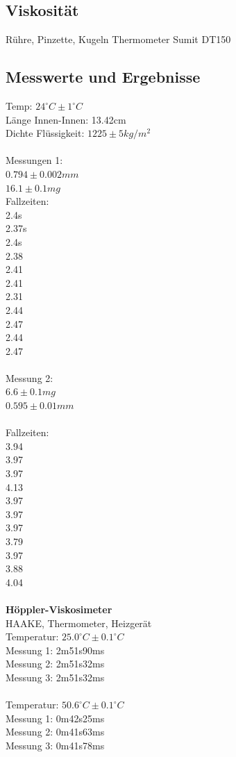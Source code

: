 \documentclass[12pt,a4paper]{article}
\begin{document}
\begin{multicols}{2}
\section{Viskosität}
Rühre, Pinzette, Kugeln
Thermometer Sumit DT150\\
\subsection{Messwerte und Ergebnisse}
Temp: $24^{\circ}C \pm 1^{\circ}C$\\
Länge Innen-Innen: 13.42cm\\
Dichte Flüssigkeit: $1225 \pm 5 kg/m^2$\\
\\
Messungen 1:\\
$0.794 \pm 0.002mm$\\
$16.1 \pm 0.1 mg$\\

Fallzeiten:\\
2.4s\\
2.37s\\
2.4s\\
2.38\\
2.41\\
2.41\\
2.31\\
2.44\\
2.47\\
2.44\\
2.47\\
\\
Messung 2:\\
$6.6 \pm 0.1mg$\\
$0.595 \pm 0.01mm$\\
\\
Fallzeiten:\\
3.94\\
3.97\\
3.97\\
4.13\\
3.97\\
3.97\\
3.97\\
3.79\\
3.97\\
3.88\\
4.04\\
\\
\textbf{Höppler-Viskosimeter}\\
HAAKE, Thermometer, Heizgerät\\
Temperatur: $25.0^{\circ}C \pm 0.1^{\circ}C$\\
Messung 1: 2m51s90ms\\
Messung 2: 2m51s32ms\\
Messung 3: 2m51s32ms\\
\\
Temperatur: $50.6^{\circ}C \pm 0.1^{\circ}C$\\
Messung 1: 0m42s25ms\\
Messung 2: 0m41s63ms\\
Messung 3: 0m41s78ms\\
\\

\end{multicols}
\end{document}
